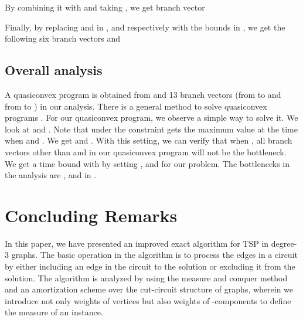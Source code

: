 \documentclass[runningheads]{llncs}
\begin{document}
By combining it with  and taking , we get branch vector


Finally, by replacing  and   in ,  and  respectively
with the bounds in , we get the following six branch vectors
and


\subsection{Overall analysis}

A quasiconvex program is obtained from  and 13 branch vectors
(from  to  and from  to )
in our analysis.
There is a general method to solve quasiconvex programs \cite{eQP}.
For our quasiconvex program, we observe a simple way to solve it.
We look at  and . Note that  under the constraint  gets the maximum value at the time when  and . We get  and . With this setting, we can verify that when , all branch vectors other than
 and  in our quasiconvex program will not be the bottleneck.
We get a time bound  with  by setting
, and  for our problem.
The bottlenecks in the analysis are   ,  and  in .



\section{Concluding Remarks}\label{sec:conclude}

In this paper, we have presented an improved exact algorithm for TSP
in  degree-3 graphs.
The basic operation in the algorithm is to process the edges
in a circuit by either
including an edge in the circuit to the solution or excluding
 it from the solution.
The algorithm is analyzed by using the measure and conquer method and
an amortization scheme over the cut-circuit structure of graphs,
wherein we introduce not only weights of vertices but also
weights of -components to define
the measure of an instance.
\end{document}
